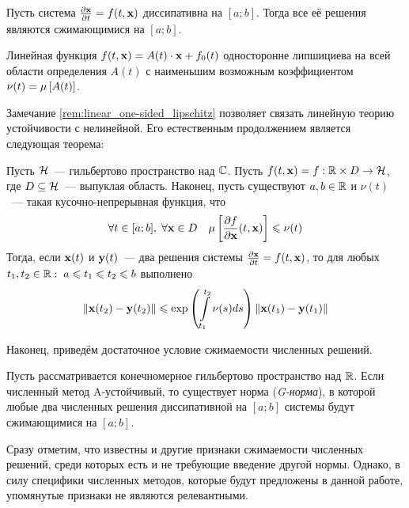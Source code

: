 \begin{statement}
    \label{def:contractivity_condition}
    Пусть система $ \frac{\partial \mathbf{x}}{\partial t} = f(t, \mathbf{x}) $ диссипативна на $ [a; b] $.
    Тогда все её решения являются сжимающимися на $ [a; b] $.
\end{statement}

\begin{remark}
    \label{rem:linear_one-sided_lipschitz}
    Линейная функция $ f(t, \mathbf{x}) = A(t) \cdot \mathbf{x} + f_0(t) $ односторонне липшициева на всей области определения $ A(t) $
    с наименьшим возможным коэффициентом $ \nu(t) = \mu \left[ A(t) \right] $.
\end{remark}

Замечание \ref{rem:linear_one-sided_lipschitz} позволяет связать линейную теорию устойчивости с нелинейной.
Его естественным продолжением является следующая теорема:

\begin{theorem}[Далквист, 1959]
    \label{thm:nonlinear_to_linear}
    Пусть $ \mathcal{H} $~--- гильбертово пространство над $ \mathbb{C} $.
    Пусть $ f(t, \mathbf{x}) = f: \mathbb{R} \times D \to \mathcal{H} $,
    где $ D \subseteq \mathcal{H} $~--- выпуклая область.
    Наконец, пусть существуют $ a, b \in \mathbb{R} $ и $ \nu(t) $~--- такая кусочно-непрерывная функция, что
    \[
        \forall t \in [a; b], \; \forall \mathbf{x} \in D \quad \mu \left[ \frac{\partial f}{\partial \mathbf{x}}(t, \mathbf{x}) \right] \leqslant \nu(t)
    \]
    Тогда, если $ \mathbf{x}(t) $ и $ \mathbf{y}(t) $~--- два решения системы $ \frac{\partial \mathbf{x}}{\partial t} = f(t, \mathbf{x}) $,
    то для любых $ t_1, t_2 \in \mathbb{R}: \; a \leqslant t_1 \leqslant t_2 \leqslant b $ выполнено
    \[
        \| \mathbf{x}(t_2) - \mathbf{y}(t_2) \| \leqslant \exp\left( \int\limits_{t_1}^{t_2} \nu(s) ds \right) \| \mathbf{x}(t_1) - \mathbf{y}(t_1) \|
    \]
\end{theorem}

Наконец, приведём достаточное условие сжимаемости численных решений.

\begin{theorem}[Далквист, 1978]
    Пусть рассматривается конечномерное гильбертово пространство над $ \mathbb{R} $.
    Если численный метод A-устойчивый, то существует норма (\emph{G-норма}),
    в которой любые два численных решения диссипативной на $ [a; b] $ системы будут сжимающимися на $ [a; b] $.
\end{theorem}

Сразу отметим, что известны и другие признаки сжимаемости численных решений,
среди которых есть и не требующие введение другой нормы.
Однако, в силу специфики численных методов, которые будут предложены в данной работе,
упомянутые признаки не являются релевантными.


